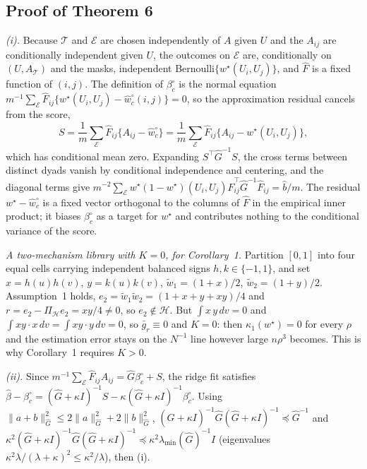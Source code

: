\documentclass[12pt]{article}
\newcommand{\calH}{\mathcal{H}}
\newcommand{\calE}{\mathcal{E}}
\newcommand{\calT}{\mathcal{T}}
\newcommand{\norm}[1]{\|#1\|}
\newcommand{\wstar}{w^{\star}}
\newcommand{\bhat}{\hat\beta}
\begin{document}
\subsection*{Proof of Theorem 6}
\emph{(i).} Because $\calT$ and $\calE$ are chosen independently of $A$ given $U$ and the $A_{ij}$ are conditionally independent given $U$, the outcomes on $\calE$ are, conditionally on $(U,A_{\calT})$ and the masks, independent Bernoulli$\{\wstar(U_i,U_j)\}$, and $\hat F$ is a fixed function of $(i,j)$. The definition of $\beta^{\circ}_{c}$ is the normal equation $m^{-1}\sum_{\calE}\hat F_{ij}\{\wstar(U_i,U_j)-\hat w^{\circ}_{c}(i,j)\}=0$, so the approximation residual cancels from the score,
\[
S=\frac1m\sum_{\calE}\hat F_{ij}\{A_{ij}-\hat w^{\circ}_{c}\}=\frac1m\sum_{\calE}\hat F_{ij}\{A_{ij}-\wstar(U_i,U_j)\},
\]
which has conditional mean zero. Expanding $S^{\top}\hat G^{-1}S$, the cross terms between distinct dyads vanish by conditional independence and centering, and the diagonal terms give $m^{-2}\sum_{\calE}\wstar(1-\wstar)(U_i,U_j)\hat F_{ij}^{\top}\hat G^{-1}\hat F_{ij}=\hat b/m$. The residual $\wstar-\hat w^{\circ}_{c}$ is a fixed vector orthogonal to the columns of $\hat F$ in the empirical inner product; it biases $\beta^{\circ}_{c}$ as a target for $\wstar$ and contributes nothing to the conditional variance of the score.

\emph{A two-mechanism library with $K=0$, for Corollary~1.} Partition $[0,1]$ into four equal cells carrying independent balanced signs $h,k\in\{-1,1\}$, and set $x=h(u)h(v)$, $y=k(u)k(v)$, $\tilde w_1=(1+x)/2$, $\tilde w_2=(1+y)/2$. Assumption~1 holds, $e_2=\tilde w_1\tilde w_2=(1+x+y+xy)/4$ and $r=e_2-\Pi_{\calH}e_2=xy/4\neq0$, so $e_2\notin\calH$. But $\int x\,y\,dv=0$ and $\int xy\cdot x\,dv=\int xy\cdot y\,dv=0$, so $\bar g_r\equiv0$ and $K=0$: then $\kappa_1(\wstar)=0$ for every $\rho$ and the estimation error stays on the $N^{-1}$ line however large $n\rho^3$ becomes. This is why Corollary~1 requires $K>0$.

\emph{(ii).} Since $m^{-1}\sum_{\calE}\hat F_{ij}A_{ij}=\hat G\beta^{\circ}_{c}+S$, the ridge fit satisfies $\bhat-\beta^{\circ}_{c}=(\hat G+\kappa I)^{-1}S-\kappa(\hat G+\kappa I)^{-1}\beta^{\circ}_{c}$. Using $\norm{a+b}^2_{\hat G}\le2\norm a^2_{\hat G}+2\norm b^2_{\hat G}$, $(\hat G+\kappa I)^{-1}\hat G(\hat G+\kappa I)^{-1}\preceq\hat G^{-1}$ and $\kappa^2(\hat G+\kappa I)^{-1}\hat G(\hat G+\kappa I)^{-1}\preceq\kappa^2\lambda_{\min}(\hat G)^{-1}I$ (eigenvalues $\kappa^2\lambda/(\lambda+\kappa)^2\le\kappa^2/\lambda$), then (i).
\end{document}
